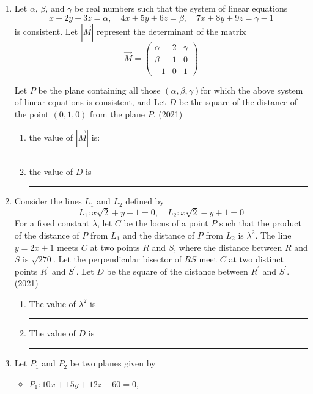 \begin{enumerate}[label=\thesubsection.\arabic*.,ref=\thesubsection.\theenumi]
\begin{multicols}{4}
\begin{enumerate}
        \item  $\frac{13}{32}$
    \end{enumerate}
\end{multicols}
%
    \item 
    Let $\alpha$, $\beta$, and $\gamma$ be real numbers such that the system of linear equations  
    \[
    x + 2y + 3z = \alpha, \quad 4x + 5y + 6z = \beta, \quad 7x + 8y + 9z = \gamma - 1
    \]  
    is consistent. Let $|\vec{M}|$ represent the determinant of the matrix  
    \[
 \vec{M} = \begin{pmatrix} \alpha & 2 & \gamma \\ \beta & 1 & 0 \\ -1 & 0 & 1 \end{pmatrix}
    \]  

    Let $P$ be the plane containing all those $(\alpha,\beta,\gamma)$for which the above system of linear 
equations is consistent, and Let $D$ be the square of the distance of the point $(0, 1, 0)$ from the plane $P$.
\hfill (2021)
%
\begin{enumerate}
	 
\item  the value of $|\vec{M}|$ is:                                \rule{1cm}{0.1pt}

	 \item the value of $D$ is \rule{1cm}{0.1pt}
\end{enumerate}
\item      Consider the lines $L_1$ and $L_2$ defined by  
    \[
    L_1: x\sqrt{2} + y - 1 = 0, \quad L_2: x\sqrt{2} - y + 1 = 0
    \]  
    For a fixed constant $\lambda$, let $C$ be the locus of a point $P$ such that the product of the distance of $P$ from $L_1$ and the distance of $P$ from $L_2$ is $\lambda^2$. The line $y = 2x + 1$ meets $C$ at two points $R$ and $S$, where the distance between $R$ and $S$ is $\sqrt{270}$.  
    Let the perpendicular bisector of $RS$ meet $C$ at two distinct points $R^{\prime}$ and $S^{\prime}$. Let $D$ be the square of the distance between $R^{\prime}$ and $S^{\prime}$.  
    \hfill (2021) 
\begin{enumerate}
 \item The value of $\lambda^2$ is  
    \rule{1cm}{0.1pt}  
 \item The value of $D$ is  
    \rule{1cm}{0.1pt}  
\end{enumerate}
\item Let $P_1$ and $P_2$ be two planes given by\begin{itemize}                                         \item $P_1: 10x + 15y + 12z - 60 = 0$,


\end{itemize}
\end{enumerate}
